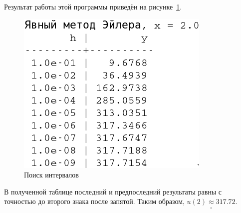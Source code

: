 Результат работы этой программы приведён на рисунке~\ref{img:answer4}.
\begin{figure}[H]
    \centering
    \caption{Поиск интервалов}\label{img:answer4}
    \includegraphics[scale=0.5]{images/euler_test.png}
\end{figure}

В полученной таблице последний и предпоследний результаты равны с точностью до второго знака после запятой. Таким образом, $\underline{\underline{u(2) \approx 317.72}}$.

